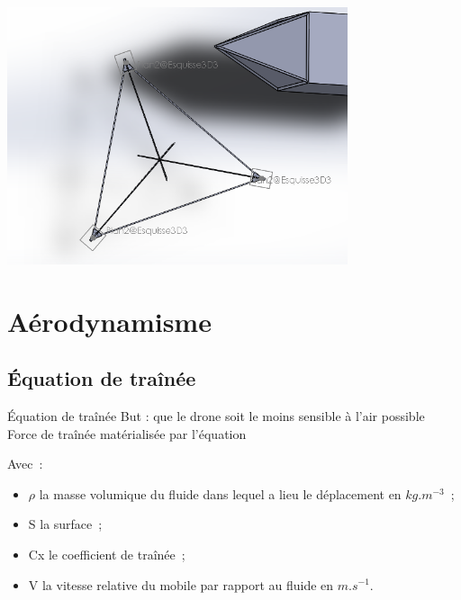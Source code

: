 \documentclass{beamer}
\begin{document}
\begin{frame}
 \begin{center}
		\includegraphics[width=10cm]{../Images/structure1_1.PNG}
 \end{center}
\end{frame}


\section{Aérodynamisme}

\subsection{Équation de traînée}
\begin{frame}{Équation de traînée}
 But : que le drone soit le moins sensible à l'air possible \\
 Force de traînée matérialisée par l'équation \\
 \begin{center}
 \end{center}
 Avec~:
 \begin{itemize}
  \item $\rho$ la masse volumique du fluide dans lequel a lieu le déplacement en $kg.m^{-3}$~;
  \item S la surface~;
  \item Cx le coefficient de traînée~;
  \item V la vitesse relative du mobile par rapport au fluide en $m.s^{-1}$.
 \end{itemize}
\end{frame}
\end{document}
